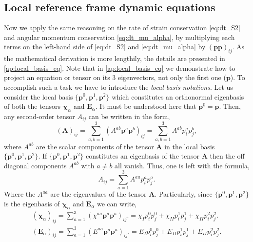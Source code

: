 \subsection{Local reference frame dynamic equations}

Now we apply the same reasoning on the rate of strain conservation \eqref{eq:dt_S2} and angular momentum conservation \eqref{eq:dt_mu_alpha},
by multiplying each terms on the left-hand side of \ref{eq:dt_S2} and \ref{eq:dt_mu_alpha} by $(\textbf{pp})_{ij}$. 
As the mathematical derivation is more lengthily, the details are presented in \ref{ap:local_basis_eq}. 
Note that in \ref{ap:local_basis_eq} we demonstrate how to project an equation or tensor on its $3$ eigenvectors, not only the first one ($\textbf{p}$). 
To accomplish such a task we have to introduce the \textit{local basis notations}. 
Let us consider the local basis $\{\textbf{p}^0, \textbf{p}^1, \textbf{p}^2\}$ which constitutes an orthonormal eigenbasis of both the tensors $\bm\chi_\alpha$ and $\textbf{E}_\alpha$. 
It must be understood here that $\textbf{p}^0 = \textbf{p}$. 
Then, any second-order tensor $A_{ij}$ can be written in the form, 
\begin{equation*}
    (\textbf{A})_{ij}
    = 
    \sum_{a,b =1}^3
    (A^{ab} \textbf{p}^a\textbf{p}^b)_{ij}
    = 
    \sum_{a,b =1}^3
    A^{ab} p_i^ap_j^b,
\end{equation*}
where $A^{ab}$ are the scalar components of the tensor \textbf{A} in the local basis  $\{\textbf{p}^0, \textbf{p}^1, \textbf{p}^2\}$. 
If $\{\textbf{p}^0, \textbf{p}^1, \textbf{p}^2\}$ constitutes an eigenbasis of the tensor \textbf{A} then the off diagonal components $A^{ab}$ with $a\neq b$ all vanish. 
Thus, one is left with the formula, 
\begin{equation*}
    A_{ij}
    = 
    \sum_{a =1}^3
    A^{aa} p_i^ap_j^a. 
\end{equation*}
Where the $A^{aa}$ are the eigenvalues of the tensor \textbf{A}. 
Particularly, since $\{\textbf{p}^0, \textbf{p}^1, \textbf{p}^2\}$ is the eigenbasis of $\bm\chi_\alpha$ and $\textbf{E}_\alpha$ we can write, 
\begin{align}
    (\bm\chi_\alpha)_{ij}
    =
    \sum_{a =1}^3
    (\chi^{aa} \textbf{p}^a\textbf{p}^a)_{ij}. 
    =
    \chi_I  p_i^0p_j^0
    + \chi_{II}  p_i^1p_j^1
    + \chi_{II}  p_i^2p_j^2. \\
    (\textbf{E}_\alpha)_{ij}
    =
    \sum_{a =1}^3
    (E^{aa} \textbf{p}^a\textbf{p}^a)_{ij}. 
    = 
    E_I  p_i^0p_j^0
    + E_{II}  p_i^1p_j^1
    + E_{II}  p_i^2p_j^2. 
\end{align}

